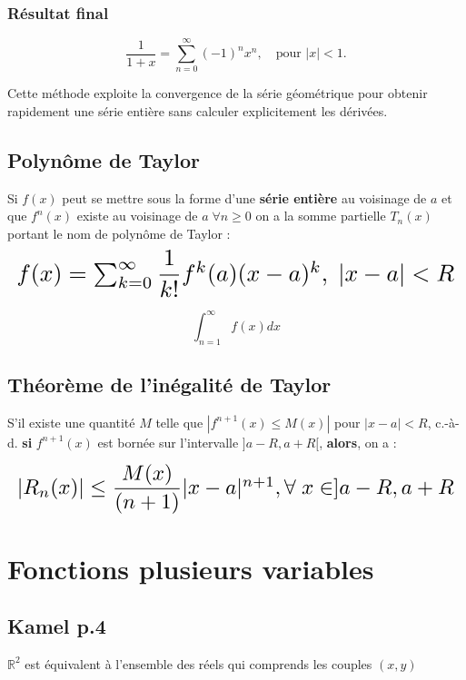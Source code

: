 \documentclass{report}
\begin{document}
\begin{multicols*}{3}
    \subsection*{Résultat final}
    \[
    \frac{1}{1 + x} = \sum_{n=0}^\infty (-1)^n x^n, \quad \text{pour } |x| < 1.
    \]

    Cette méthode exploite la convergence de la série géométrique pour obtenir rapidement
    une série entière sans calculer explicitement les dérivées.

    \section{Polynôme de Taylor}
    Si \( f(x) \) peut se mettre sous la forme d'une \textbf{série entière} au voisinage de 
    \( a \) et que \( f^{n}(x) \) existe au voisinage de \( a  \; \forall n \geq 0\) on 
    a la somme partielle \( T_n(x) \) portant le nom de polynôme de Taylor : 
    \begin{align*}
        \resizebox{\linewidth}{!}{$
            f(x) = \sum_{k=0}^{\infty }\dfrac{1}{k!}f^{k}(a)(x - a)^k, \; |x - a| < R
        $}
    \end{align*}            

    $$\int_{n=1}^{\infty }f(x)dx$$

     \section{Théorème de l'inégalité de Taylor}

     S'il existe une quantité $M$ telle que 
     $\left| f^{n+1}(x) \leq M(x) \right|$ pour 
     $|x - a| < R$, c.-à-d. \textbf{si}  
     $f^{n+1}(x)$ est bornée sur l'intervalle 
     $]a - R, a + R[$, \textbf{alors}, on a : 

     \begin{align*}
         \resizebox{1\linewidth}{!}{$ 
         |R_n(x)| \leq \dfrac{M(x)}{(n + 1)}|x - a|^{n+1}, 
         \forall \; x \in ]a - R, a + R
    $}
     \end{align*}               

     \chapter{Fonctions plusieurs variables}


     \section{Kamel p.4}
     $\mathbb{R}^2$ est équivalent à l'ensemble des réels qui comprends 
     les couples $(x, y)$



\end{multicols*}
\end{document}
